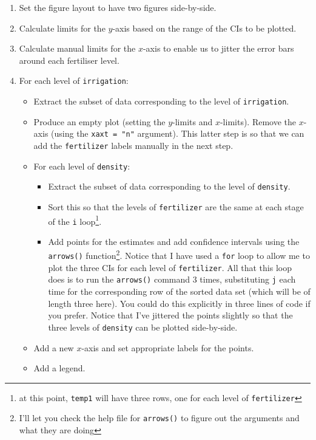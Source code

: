 \documentclass[]{book}
\providecommand{\tightlist}{%
  \setlength{\itemsep}{0pt}\setlength{\parskip}{0pt}}
\let\rmarkdownfootnote\footnote%
\def\footnote{\protect\rmarkdownfootnote}
\theoremstyle{definition}
\theoremstyle{definition}
\theoremstyle{definition}
\theoremstyle{remark}
\begin{document}
\begin{enumerate}
\def\labelenumi{\arabic{enumi}.}
\tightlist
\item
  Set the figure layout to have two figures side-by-side.
\item
  Calculate limits for the \(y\)-axis based on the range of the CIs to
  be plotted.
\item
  Calculate manual limits for the \(x\)-axis to enable us to jitter the
  error bars around each fertiliser level.
\item
  For each level of \texttt{irrigation}:

  \begin{itemize}
  \tightlist
  \item
    Extract the subset of data corresponding to the level of
    \texttt{irrigation}.
  \item
    Produce an empty plot (setting the \(y\)-limits and \(x\)-limits).
    Remove the \(x\)-axis (using the \texttt{xaxt\ =\ "n"} argument).
    This latter step is so that we can add the \texttt{fertilizer}
    labels manually in the next step.
  \item
    For each level of \texttt{density}:

    \begin{itemize}
    \tightlist
    \item
      Extract the subset of data corresponding to the level of
      \texttt{density}.
    \item
      Sort this so that the levels of \texttt{fertilizer} are the same
      at each stage of the \texttt{i} loop\footnote{at this point,
        \texttt{temp1} will have three rows, one for each level of
        \texttt{fertilizer}}.
    \item
      Add points for the estimates and add confidence intervals using
      the \texttt{arrows()} function\footnote{I'll let you check the
        help file for \texttt{arrows()} to figure out the arguments and
        what they are doing}. Notice that I have used a \texttt{for}
      loop to allow me to plot the three CIs for each level of
      \texttt{fertilizer}. All that this loop does is to run the
      \texttt{arrows()} command 3 times, substituting \texttt{j} each
      time for the corresponding row of the sorted data set (which will
      be of length three here). You could do this explicitly in three
      lines of code if you prefer. Notice that I've jittered the points
      slightly so that the three levels of \texttt{density} can be
      plotted side-by-side.
    \end{itemize}
  \item
    Add a new \(x\)-axis and set appropriate labels for the points.
  \item
    Add a legend.
  \end{itemize}
\end{enumerate}
\end{document}
